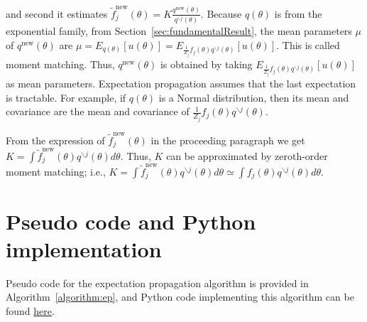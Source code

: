 \documentclass{article}
\begin{document}
\noindent and second it estimates
$\tilde{f}_j^\text{new}(\theta)=K\frac{q^\text{new}(\theta)}{q^{\backslash
j}(\theta)}$.
%
Because $q(\theta)$ is from the exponential family, from
Section~\ref{sec:fundamentalResult}, the mean parameters $\mu$ of
$q^\text{new}(\theta)$ are
$\mu=E_{q(\theta)}[u(\theta)]=E_{\frac{1}{Z_j}f_j(\theta)q^{\backslash
j}(\theta)}[u(\theta)]$. This is called moment matching. Thus,
$q^\text{new}(\theta)$ is obtained by taking
$E_{\frac{1}{Z_j}f_j(\theta)q^{\backslash j}(\theta)}[u(\theta)]$ as mean
parameters. Expectation propagation assumes that the last expectation is
tractable.
%
For example, if $q(\theta)$ is a Normal distribution, then its mean and
covariance are the mean and covariance of
$\frac{1}{Z_j}f_j(\theta)q^{\backslash j}(\theta)$.

From the expression of $\tilde{f}_j^\text{new}(\theta)$ in the proceeding
paragraph we get $K=\int \tilde{f}_j^\text{new}(\theta)q^{\backslash
j}(\theta)d\theta$. Thus, $K$ can be approximated by zeroth-order moment
matching; i.e., $K=\int \tilde{f}_j^\text{new}(\theta)q^{\backslash
j}(\theta)d\theta\simeq \int f_j(\theta)q^{\backslash j}(\theta)d\theta$.

\section{Pseudo code and Python implementation}

Pseudo code for the expectation propagation algorithm is provided in Algorithm~\ref{algorithm:ep}, and Python code implementing this algorithm can be found \href{https://github.com/joacorapela/expectationPropagation}{here}.
\end{document}
